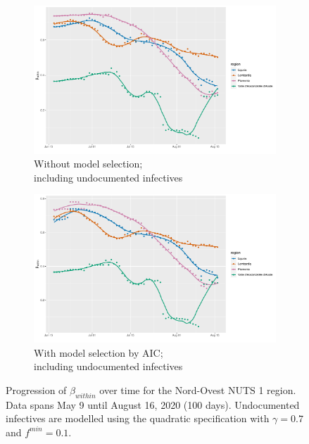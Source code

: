 \documentclass[12pt]{article}
\begin{document}
\begin{appendices}
\begin{figure}[H]
\begin{subfigure}{\textwidth}
    	      \includegraphics[width=0.92\linewidth]{output/model_within_lag14_betawithin_Nord-Ovest_UndocQuadratic_rolling.pdf}
    	      \caption{Without model selection; \\ including undocumented infectives}
    	      \label{fig:beta_within_over_time_northwest_regular_undoc}
    	    \end{subfigure}\newline
    	    \begin{subfigure}{\textwidth}
    	      \centering
    	      \includegraphics[width=0.92\linewidth]{output/model_within_lag14_betawithin_Nord-Ovest_aic_UndocQuadratic_rolling.pdf}
    	      \caption{With model selection by AIC; \\ including undocumented infectives}
    	      \label{fig:beta_within_over_time_northwest_aic_undoc}
    	    \end{subfigure}
    	    \caption{Progression of $\beta_{within}$ over time for the Nord-Ovest NUTS 1 region. Data spans May 9 until August 16, 2020 (100 days). Undocumented infectives are modelled using the quadratic specification with $\gamma = 0.7$ and $f^{min}=0.1$.}
    	    \label{fig:beta_within_over_time_northwest}
    	\end{figure}
		

\end{appendices}
\end{document}
